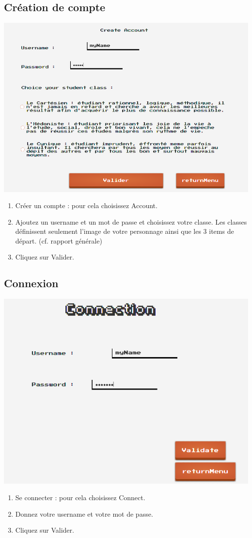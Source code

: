 \documentclass[a4paper,10pt]{report}
\begin{document}
\subsection{Création de compte}
\includegraphics[scale=0.3]{images/account.png}
\begin{enumerate}
 \item Créer un compte : pour cela choisissez Account.
 \item Ajoutez un username et un mot de passe et choisissez votre classe. Les classes définissent seulement l'image de votre personnage ainsi que les 3 items de départ. (cf. rapport générale)
 \item Cliquez sur Valider.
\end{enumerate}

\subsection{Connexion}
\includegraphics[scale=0.3]{images/connect.png}
\begin{enumerate}
 \item Se connecter : pour cela choisissez Connect.
 \item Donnez votre username et votre mot de passe.
 \item Cliquez sur Valider.
\end{enumerate}
\end{document}

